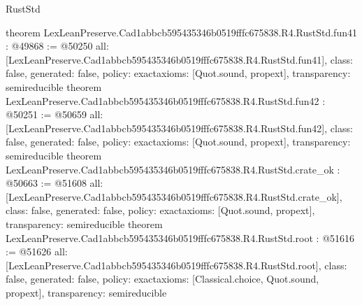 \begin{lexlean}{RustStd}
\begin{coremodule}
{}
theorem LexLeanPreserve.Cad1abbcb595435346b0519fffc675838.R4.RustStd.fun41 : @49868 := @50250 {
  all: [LexLeanPreserve.Cad1abbcb595435346b0519fffc675838.R4.RustStd.fun41],
  class: false,
  generated: false,
  policy: exact{axioms: [Quot.sound, propext]},
  transparency: semireducible
}
theorem LexLeanPreserve.Cad1abbcb595435346b0519fffc675838.R4.RustStd.fun42 : @50251 := @50659 {
  all: [LexLeanPreserve.Cad1abbcb595435346b0519fffc675838.R4.RustStd.fun42],
  class: false,
  generated: false,
  policy: exact{axioms: [Quot.sound, propext]},
  transparency: semireducible
}
theorem LexLeanPreserve.Cad1abbcb595435346b0519fffc675838.R4.RustStd.crate_ok : @50663 := @51608 {
  all: [LexLeanPreserve.Cad1abbcb595435346b0519fffc675838.R4.RustStd.crate_ok],
  class: false,
  generated: false,
  policy: exact{axioms: [Quot.sound, propext]},
  transparency: semireducible
}
theorem LexLeanPreserve.Cad1abbcb595435346b0519fffc675838.R4.RustStd.root : @51616 := @51626 {
  all: [LexLeanPreserve.Cad1abbcb595435346b0519fffc675838.R4.RustStd.root],
  class: false,
  generated: false,
  policy: exact{axioms: [Classical.choice, Quot.sound, propext]},
  transparency: semireducible
}


\end{coremodule}
\end{lexlean}
